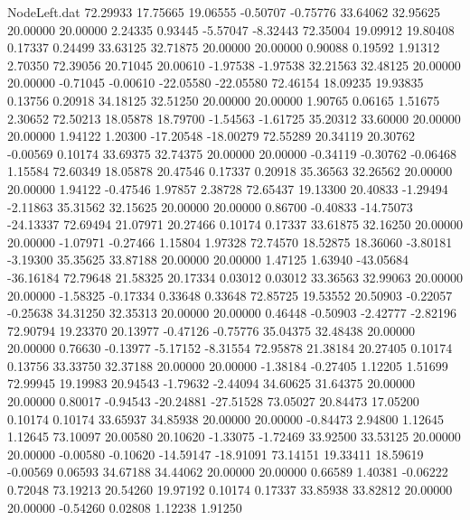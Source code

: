 \begin{filecontents}{NodeLeft.dat}
  72.29933   17.75665   19.06555    -0.50707   -0.75776   33.64062   32.95625   20.00000   20.00000    2.24335    0.93445   -5.57047   -8.32443
  72.35004   19.09912   19.80408     0.17337    0.24499   33.63125   32.71875   20.00000   20.00000    0.90088    0.19592    1.91312    2.70350
  72.39056   20.71045   20.00610    -1.97538   -1.97538   32.21563   32.48125   20.00000   20.00000   -0.71045   -0.00610  -22.05580  -22.05580
  72.46154   18.09235   19.93835     0.13756    0.20918   34.18125   32.51250   20.00000   20.00000    1.90765    0.06165    1.51675    2.30652
  72.50213   18.05878   18.79700    -1.54563   -1.61725   35.20312   33.60000   20.00000   20.00000    1.94122    1.20300  -17.20548  -18.00279
  72.55289   20.34119   20.30762    -0.00569    0.10174   33.69375   32.74375   20.00000   20.00000   -0.34119   -0.30762   -0.06468    1.15584
  72.60349   18.05878   20.47546     0.17337    0.20918   35.36563   32.26562   20.00000   20.00000    1.94122   -0.47546    1.97857    2.38728
  72.65437   19.13300   20.40833    -1.29494   -2.11863   35.31562   32.15625   20.00000   20.00000    0.86700   -0.40833  -14.75073  -24.13337
  72.69494   21.07971   20.27466     0.10174    0.17337   33.61875   32.16250   20.00000   20.00000   -1.07971   -0.27466    1.15804    1.97328
  72.74570   18.52875   18.36060    -3.80181   -3.19300   35.35625   33.87188   20.00000   20.00000    1.47125    1.63940  -43.05684  -36.16184
  72.79648   21.58325   20.17334     0.03012    0.03012   33.36563   32.99063   20.00000   20.00000   -1.58325   -0.17334    0.33648    0.33648
  72.85725   19.53552   20.50903    -0.22057   -0.25638   34.31250   32.35313   20.00000   20.00000    0.46448   -0.50903   -2.42777   -2.82196
  72.90794   19.23370   20.13977    -0.47126   -0.75776   35.04375   32.48438   20.00000   20.00000    0.76630   -0.13977   -5.17152   -8.31554
  72.95878   21.38184   20.27405     0.10174    0.13756   33.33750   32.37188   20.00000   20.00000   -1.38184   -0.27405    1.12205    1.51699
  72.99945   19.19983   20.94543    -1.79632   -2.44094   34.60625   31.64375   20.00000   20.00000    0.80017   -0.94543  -20.24881  -27.51528
  73.05027   20.84473   17.05200     0.10174    0.10174   33.65937   34.85938   20.00000   20.00000   -0.84473    2.94800    1.12645    1.12645
  73.10097   20.00580   20.10620    -1.33075   -1.72469   33.92500   33.53125   20.00000   20.00000   -0.00580   -0.10620  -14.59147  -18.91091
  73.14151   19.33411   18.59619    -0.00569    0.06593   34.67188   34.44062   20.00000   20.00000    0.66589    1.40381   -0.06222    0.72048
  73.19213   20.54260   19.97192     0.10174    0.17337   33.85938   33.82812   20.00000   20.00000   -0.54260    0.02808    1.12238    1.91250

\end{filecontents}

